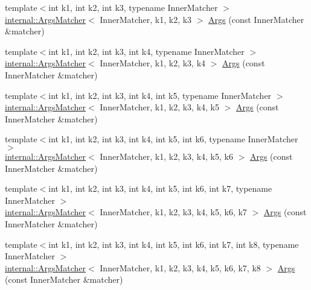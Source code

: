 \begin{DoxyCompactItemize}
\item 
{\footnotesize template$<$int k1, int k2, int k3, typename Inner\+Matcher $>$ }\\\mbox{\hyperlink{classtesting_1_1internal_1_1_args_matcher}{internal\+::\+Args\+Matcher}}$<$ Inner\+Matcher, k1, k2, k3 $>$ \mbox{\hyperlink{namespacetesting_abd3ddae153e1c452b7625808cc4d820b}{Args}} (const Inner\+Matcher \&matcher)
\item 
{\footnotesize template$<$int k1, int k2, int k3, int k4, typename Inner\+Matcher $>$ }\\\mbox{\hyperlink{classtesting_1_1internal_1_1_args_matcher}{internal\+::\+Args\+Matcher}}$<$ Inner\+Matcher, k1, k2, k3, k4 $>$ \mbox{\hyperlink{namespacetesting_aeff7e644fd00516c3519fe8c0dc1aee2}{Args}} (const Inner\+Matcher \&matcher)
\item 
{\footnotesize template$<$int k1, int k2, int k3, int k4, int k5, typename Inner\+Matcher $>$ }\\\mbox{\hyperlink{classtesting_1_1internal_1_1_args_matcher}{internal\+::\+Args\+Matcher}}$<$ Inner\+Matcher, k1, k2, k3, k4, k5 $>$ \mbox{\hyperlink{namespacetesting_aede9fd33cce0d21f5e31ba10a0706827}{Args}} (const Inner\+Matcher \&matcher)
\item 
{\footnotesize template$<$int k1, int k2, int k3, int k4, int k5, int k6, typename Inner\+Matcher $>$ }\\\mbox{\hyperlink{classtesting_1_1internal_1_1_args_matcher}{internal\+::\+Args\+Matcher}}$<$ Inner\+Matcher, k1, k2, k3, k4, k5, k6 $>$ \mbox{\hyperlink{namespacetesting_abc92e87b4a9cad372b082d81479f3d48}{Args}} (const Inner\+Matcher \&matcher)
\item 
{\footnotesize template$<$int k1, int k2, int k3, int k4, int k5, int k6, int k7, typename Inner\+Matcher $>$ }\\\mbox{\hyperlink{classtesting_1_1internal_1_1_args_matcher}{internal\+::\+Args\+Matcher}}$<$ Inner\+Matcher, k1, k2, k3, k4, k5, k6, k7 $>$ \mbox{\hyperlink{namespacetesting_a9a9ef7a866b397430527076e342817f9}{Args}} (const Inner\+Matcher \&matcher)
\item 
{\footnotesize template$<$int k1, int k2, int k3, int k4, int k5, int k6, int k7, int k8, typename Inner\+Matcher $>$ }\\\mbox{\hyperlink{classtesting_1_1internal_1_1_args_matcher}{internal\+::\+Args\+Matcher}}$<$ Inner\+Matcher, k1, k2, k3, k4, k5, k6, k7, k8 $>$ \mbox{\hyperlink{namespacetesting_ae8a4e8e1b8eb87c9f1e5f02519da7fce}{Args}} (const Inner\+Matcher \&matcher)
\item 

\end{DoxyCompactItemize}
